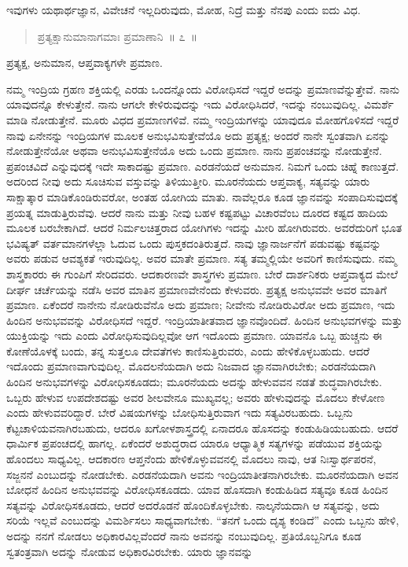 \vspace{-0.1cm}

ಇವುಗಳು ಯಥಾರ್ಥಜ್ಞಾನ, ವಿವೇಚನೆ ಇಲ್ಲದಿರುವುದು, ಮೋಹ, ನಿದ್ರೆ ಮತ್ತು ನೆನಪು ಎಂದು ಐದು ವಿಧ. 

\vspace{-0.2cm}

\begin{verse}
ಪ್ರತ್ಯಕ್ಷಾನುಮಾನಾಗಮಾಃ ಪ್ರಮಾಣಾನಿ~॥ ೭~॥
\end{verse}

\vspace{-0.1cm}

ಪ್ರತ್ಯಕ್ಷ, ಅನುಮಾನ, ಆಪ್ತವಾಕ್ಯಗಳೇ ಪ್ರಮಾಣ. 

\vskip 6pt

ನಮ್ಮ ಇಂದ್ರಿಯ ಗ್ರಹಣ ಶಕ್ತಿಯಲ್ಲಿ ಎರಡು ಒಂದನ್ನೊಂದು ವಿರೋಧಿಸದೆ ಇದ್ದರೆ ಅದನ್ನು ಪ್ರಮಾಣವೆನ್ನುತ್ತೇವೆ. ನಾನು ಯಾವುದನ್ನೊ ಕೇಳುತ್ತೇನೆ. ನಾನು ಆಗಲೇ ಕೇಳಿರುವುದನ್ನು ಇದು ವಿರೋಧಿಸಿದರೆ, ಇದನ್ನು ನಂಬುವುದಿಲ್ಲ. ವಿಮರ್ಶೆ ಮಾಡಿ ನೋಡುತ್ತೇನೆ. ಮೂರು ವಿಧದ ಪ್ರಮಾಣಗಳಿವೆ. ನಮ್ಮ ಇಂದ್ರಿಯಗಳನ್ನು ಯಾವುದೂ ಮೋಹಗೊಳಿಸದೆ ಇದ್ದರೆ ನಾವು ಏನೇನನ್ನು ಇಂದ್ರಿಯಗಳ ಮೂಲಕ ಅನುಭವಿಸುತ್ತೇವೆಯೊ ಅದು ಪ್ರತ್ಯಕ್ಷ; ಅಂದರೆ ನಾನೇ ಸ್ವಂತವಾಗಿ ಏನನ್ನು ನೋಡುತ್ತೇನೆಯೋ ಅಥವಾ ಅನುಭವಿಸುತ್ತೇನೆಯೊ ಅದು ಒಂದು ಪ್ರಮಾಣ. ನಾನು ಪ್ರಪಂಚವನ್ನು ನೋಡುತ್ತೇನೆ. ಪ್ರಪಂಚವಿದೆ ಎನ್ನುವುದಕ್ಕೆ ಇದೇ ಸಾಕಾದಷ್ಟು ಪ್ರಮಾಣ. ಎರಡನೆಯದೆ ಅನುಮಾನ. ನಿಮಗೆ ಒಂದು ಚಿಹ್ನೆ ಕಾಣುತ್ತದೆ. ಅದರಿಂದ ನೀವು ಅದು ಸೂಚಿಸುವ ವಸ್ತುವನ್ನು ತಿಳಿಯುತ್ತೀರಿ. ಮೂರನೆಯದು ಆಪ್ತವಾಕ್ಯ, ಸತ್ಯವನ್ನು ಯಾರು ಸಾಕ್ಷಾತ್ಕಾರ ಮಾಡಿಕೊಂಡಿರುವರೋ, ಅಂತಹ ಯೋಗಿಯ ಮಾತು. ನಾವೆಲ್ಲರೂ ಕೂಡ ಜ್ಞಾನವನ್ನು ಸಂಪಾದಿಸುವುದಕ್ಕೆ ಪ್ರಯತ್ನ ಮಾಡುತ್ತಿರುವೆವು. ಆದರೆ ನಾನು ಮತ್ತು ನೀವು ಬಹಳ ಕಷ್ಟಪಟ್ಟು ವಿಚಾರವೆಂಬ ದೂರದ ಕಷ್ಟದ ಹಾದಿಯ ಮೂಲಕ ಬರಬೇಕಾಗಿದೆ. ಆದರೆ ನಿರ್ಮಲಚಿತ್ತರಾದ ಯೋಗಿಗಳು ಇದನ್ನು ಮೀರಿ ಹೋಗಿರುವರು. ಅವರೆದುರಿಗೆ ಭೂತ ಭವಿಷ್ಯತ್​ ವರ್ತಮಾನಗಳೆಲ್ಲಾ ಓದುವ ಒಂದು ಪುಸ್ತಕದಂತಿರುತ್ತದೆ. ನಾವು ಜ್ಞಾನಾರ್ಜನೆಗೆ ಪಡುವಷ್ಟು ಕಷ್ಟವನ್ನು ಅವರು ಪಡುವ ಆವಶ್ಯಕತೆ ಇರುವುದಿಲ್ಲ. ಅವರ ಮಾತೇ ಪ್ರಮಾಣ. ಸತ್ಯ ತಮ್ಮಲ್ಲಿಯೇ ಅವರಿಗೆ ಕಾಣಿಸುವುದು. ನಮ್ಮ ಶಾಸ್ತ್ರಕಾರರು ಈ ಗುಂಪಿಗೆ ಸೇರಿದವರು. ಆದಕಾರಣವೇ ಶಾಸ್ತ್ರಗಳು ಪ್ರಮಾಣ. ಬೇರೆ ದಾರ್ಶನಿಕರು ಆಪ್ತವಾಕ್ಯದ ಮೇಲೆ ದೀರ್ಘ ಚರ್ಚೆಯನ್ನು ನಡೆಸಿ ಅವರ ಮಾತಿನ ಪ್ರಮಾಣವೇನೆಂದು ಕೇಳುವರು. ಪ್ರತ್ಯಕ್ಷ ಅನುಭವವೇ ಅವರ ಮಾತಿಗೆ ಪ್ರಮಾಣ. ಏಕೆಂದರೆ ನಾನೇನು ನೋಡಿರುವೆನೊ ಅದು ಪ್ರಮಾಣ; ನೀವೇನು ನೋಡಿರುವಿರೋ ಅದು ಪ್ರಮಾಣ, ಇದು ಹಿಂದಿನ ಅನುಭವವನ್ನು ವಿರೋಧಿಸದೆ ಇದ್ದರೆ. ಇಂದ್ರಿಯಾತೀತವಾದ ಜ್ಞಾನವೊಂದಿದೆ. ಹಿಂದಿನ ಅನುಭವಗಳನ್ನು ಮತ್ತು ಯುಕ್ತಿಯನ್ನು ಇದು ಎಂದು ವಿರೋಧಿಸುವುದಿಲ್ಲವೋ ಆಗ ಇದೊಂದು ಪ್ರಮಾಣ. ಯಾವನೊ ಒಬ್ಬ ಹುಚ್ಚನು ಈ ಕೋಣೆಯೊಳಕ್ಕೆ ಬಂದು, ತನ್ನ ಸುತ್ತಲೂ ದೇವತೆಗಳು ಕಾಣಿಸುತ್ತಿರುವರು, ಎಂದು ಹೇಳಿಕೊಳ್ಳಬಹುದು. ಆದರೆ ಇದೊಂದು ಪ್ರಮಾಣವಾಗುವುದಿಲ್ಲ. ಮೊದಲನೆಯದಾಗಿ ಅದು ನಿಜವಾದ ಜ್ಞಾನವಾಗಿರಬೇಕು; ಎರಡನೆಯದಾಗಿ ಹಿಂದಿನ ಅನುಭವಗಳನ್ನು ವಿರೋಧಿಸಕೂಡದು; ಮೂರನೆಯದು ಅದನ್ನು ಹೇಳುವವನ ನಡತೆ ಶುದ್ಧವಾಗಿರಬೇಕು. ಒಬ್ಬರು ಹೇಳುವ ಉಪದೇಶದಷ್ಟು ಅವರ ಶೀಲವೇನೂ ಮುಖ್ಯವಲ್ಲ; ಅವರು ಹೇಳುವುದನ್ನು ಮೊದಲು ಕೇಳೋಣ ಎಂದು ಹೇಳುವವರಿದ್ದಾರೆ. ಬೇರೆ ವಿಷಯಗಳನ್ನು ಬೋಧಿಸುತ್ತಿರುವಾಗ ಇದು ಸತ್ಯವಿರಬಹುದು. ಒಬ್ಬನು ಕೆಟ್ಟಚಾಳಿಯವನಾಗಿರಬಹುದು, ಆದರೂ ಖಗೋಳಶಾಸ್ತ್ರದಲ್ಲಿ ಏನಾದರೂ ಹೊಸದನ್ನು ಕಂಡುಹಿಡಿಯಬಹುದು. ಆದರೆ ಧಾರ್ಮಿಕ ಪ್ರಪಂಚದಲ್ಲಿ ಹಾಗಲ್ಲ. ಏಕೆಂದರೆ ಅಶುದ್ಧರಾದ ಯಾರೂ ಆಧ್ಯಾತ್ಮಿಕ ಸತ್ಯಗಳನ್ನು ಪಡೆಯುವ ಶಕ್ತಿಯನ್ನು ಹೊಂದಲು ಸಾಧ್ಯವಿಲ್ಲ. ಆದಕಾರಣ ಆಪ್ತನೆಂದು ಹೇಳಿಕೊಳ್ಳುವವನಲ್ಲಿ ಮೊದಲು ನಾವು, ಆತ ನಿಃಸ್ವಾರ್ಥಪರನೆ, ಸಜ್ಜನನೆ ಎಂಬುದನ್ನು ನೋಡಬೇಕು. ಎರಡನೆಯದಾಗಿ ಅವನು ಇಂದ್ರಿಯಾತೀತನಾಗಿರಬೇಕು. ಮೂರನೆಯದಾಗಿ ಅವನ ಬೋಧನೆ ಹಿಂದಿನ ಅನುಭವವನ್ನು ವಿರೋಧಿಸಕೂಡದು. ಯಾವ ಹೊಸದಾಗಿ ಕಂಡುಹಿಡಿದ ಸತ್ಯವೂ ಕೂಡ ಹಿಂದಿನ ಸತ್ಯವನ್ನು ವಿರೋಧಿಸಕೂಡದು, ಆದರೆ ಅದರೊಡನೆ ಹೊಂದಿಕೊಳ್ಳಬೇಕು. ನಾಲ್ಕನೆಯದಾಗಿ ಆ ಸತ್ಯವನ್ನು, ಅದು ಸರಿಯೆ ಇಲ್ಲವೆ ಎಂಬುದನ್ನು ವಿಮರ್ಶಿಸಲು ಸಾಧ್ಯವಾಗಬೇಕು. “ತನಗೆ ಒಂದು ದೃಶ್ಯ ಕಂಡಿದೆ” ಎಂದು ಒಬ್ಬನು ಹೇಳಿ, ಅದನ್ನು ನನಗೆ ನೋಡಲು ಅಧಿಕಾರವಿಲ್ಲವೆಂದರೆ ನಾನು ಅವನನ್ನು ನಂಬುವುದಿಲ್ಲ. ಪ್ರತಿಯೊಬ್ಬನಿಗೂ ಕೂಡ ಸ್ವತಂತ್ರವಾಗಿ ಅದನ್ನು ನೋಡುವ ಅಧಿಕಾರವಿರಬೇಕು. ಯಾರು ಜ್ಞಾನವನ್ನು 